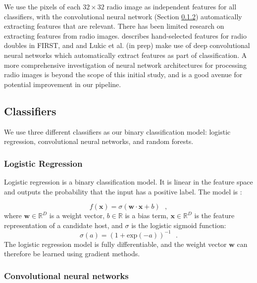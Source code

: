 \documentclass[fleqn,usenatbib,usedcolumn]{mnras}
\renewcommand{\vec}[1]{\mathbf{#1}}
\begin{document}
    We use the pixels of each $32 \times 32$ radio image as independent
    features for all classifiers, with the convolutional neural network
    (Section \ref{sec:convolutional-neural-networks}) automatically extracting
    features that are relevant. There has been limited research on extracting
    features from radio images. \citet{proctor06} describes hand-selected
    features for radio doubles in FIRST, and \citet{aniyan17cnn} and
    Lukic et al. (in prep) make use of deep convolutional neural networks
    which automatically extract features as part of classification. A more
    comprehensive investigation of neural network architectures for processing
    radio images is beyond the scope of this initial study, and is a good
    avenue for potential improvement in our pipeline.

  \subsection{Classifiers}\label{sec:classifiers}

    We use three different classifiers as our binary classification model:
    logistic regression, convolutional neural networks, and random forests.

    \subsubsection{Logistic Regression}
    \label{sec:logistic-regression}
      Logistic regression is a binary classification model. It is linear in the
      feature space and outputs the probability that the input has a positive
      label. The model is \citep{bishop06ml}:

      \begin{equation}
          f(\vec x) = \sigma(\vec w \cdot \vec x + b) \,\,\,\,,
      \end{equation}
      where $\vec w \in \mathbb{R}^D$ is a weight vector,
      $b \in \mathbb{R}$ is a bias term, $\vec x \in \mathbb{R}^D$ is the
      feature representation of a candidate host, and $\sigma$ is the
      logistic sigmoid function: \begin{equation}
          \sigma(a) = (1 + \mathrm{exp}(-a))^{-1}\,\,\,\,.
      \end{equation}%
      The logistic regression model is fully differentiable, and the weight
      vector $\vec w$ can therefore be learned using gradient methods.

    \subsubsection{Convolutional neural networks}
    \label{sec:convolutional-neural-networks}
\end{document}
